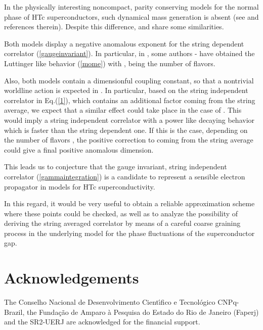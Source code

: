 \documentclass[a4paper,12pt]{article}
\begin{document}
In the physically interesting noncompact, parity conserving \coordHE{} models for the normal phase of HTc superconductors, such dynamical mass generation is absent (see \cite{ftv1} and references therein). 
Despite this difference, \coordHE{} and \coordHE{} share some similarities.

Both models display a negative anomalous exponent for the string dependent correlator (\ref{gaugeinvariant}). In particular, in \coordHE{}, some authors \cite{rw2}-\cite{gkr} have obtained the Luttinger like behavior (\ref{mome}) with \coordHE{},  \coordHE{} being the number of flavors.

Also, both models contain a dimensionful coupling constant, so that a nontrivial worldline action is expected in \coordHE{}. In particular, based on the string independent \coordHE{} correlator in Eq.(\ref{1}), which contains an additional factor \coordHE{} coming from the string average, we expect that a similar effect could take place in the case of \coordHE{}. This would imply a string independent \coordHE{} correlator with a power like decaying behavior which is faster than the string dependent one. If this is the case, depending on the number of flavors \coordHE{}, the positive correction to \coordHE{} coming from the string average could give a final positive anomalous dimension.

This leads us to conjecture that the gauge invariant, string independent correlator (\ref{gammaintegration}) is a candidate to represent a sensible electron propagator in \coordHE{} models for HTc superconductivity.
 
In this regard, it would be very useful to obtain a reliable approximation scheme where these points could be checked, as well as to analyze the possibility of deriving the string averaged correlator by means of a careful coarse graining process in the underlying model for the phase fluctuations of the superconductor gap.



\section*{Acknowledgements}

The Conselho Nacional de Desenvolvimento Cient\'{\i }fico e Tecnol\'{o}gico
CNPq-Brazil, the Funda{\c{c}}{\~{a}}o de Amparo {\`{a}} Pesquisa do Estado
do Rio de Janeiro (Faperj) and the SR2-UERJ are acknowledged for the
financial support.
\end{document}
